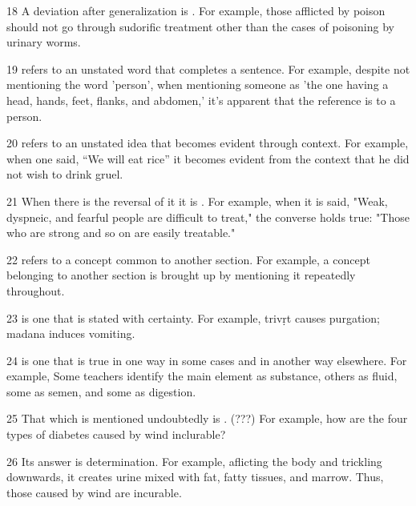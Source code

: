 \begin{translation}
\item [18] A deviation after generalization is . For example, those afflicted by poison should not go through sudorific treatment other than the cases of poisoning by urinary worms.

\item [19]  refers to an unstated word that completes a sentence. For example, despite not mentioning the word 'person', when mentioning someone as 'the one having a head, hands, feet, flanks, and abdomen,' it's apparent that the reference is to a person. 

\item [20]  refers to an unstated idea that becomes evident through context. For example, when one said, “We will eat rice” it becomes evident from the context that he did not wish to drink gruel. 

\item [21] When there is the reversal of it it is . For example, when it is said, "Weak, dyspneic, and fearful people are difficult to treat," the converse holds true: "Those who are strong and so on are easily treatable." 

\item [22]  refers to a concept common to another section. For example, a concept belonging to another section is brought up by mentioning it repeatedly throughout. 

\item [23]  is one that is stated with certainty. For example, \gls{trivṛt} causes purgation; \gls{madana} induces vomiting.

\item [24]  is one that is true in one way in some cases and in another way elsewhere. For example, Some teachers identify the main element as substance, others as fluid, some as semen, and some as digestion. 

\item [25] That which is mentioned undoubtedly is . (???) For example, how are the four types of diabetes caused by wind inclurable?

\item [26] Its answer is determination. For example, aflicting the body and trickling downwards, it creates urine mixed with fat, fatty tissues, and marrow. Thus, those caused by wind are incurable. 


\end{translation}
